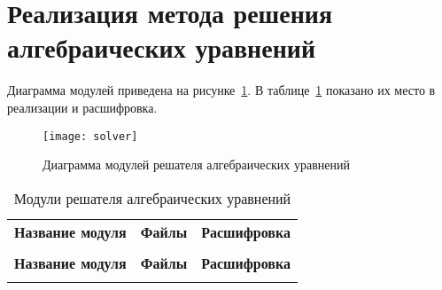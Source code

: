 \section{Реализация метода решения алгебраических уравнений}\label{solverimpl}

Диаграмма модулей приведена на рисунке~\ref{solvermodules}. В таблице~\ref{solvermodulestable} показано их место в реализации и расшифровка.

\begin{figure}[H]
    \centering
    \texttt{[image: solver]}
    \caption{Диаграмма модулей решателя алгебраических уравнений\label{solvermodules}}
\end{figure}

\begin{centering}
    \begin{longtable}{|l|l|l|}
        \caption{Модули решателя алгебраических уравнений} \label{solvermodulestable}                                                                                                                                                                                              \\

        \hline \multicolumn{1}{|c|}{\textbf{Название модуля}} & \multicolumn{1}{c|}{\textbf{Файлы}}                                                                                                      & \multicolumn{1}{c|}{\textbf{Расшифровка}}                               \\ \hhline{|=|=|=|}
        \endfirsthead

        \multicolumn{3}{c}%
        {\hspace{-12.5cm}{Окончание таблицы \thetable} \vspace{1ex}}                                                                                                                                                                                                               \\
        \hline \multicolumn{1}{|c|}{\textbf{Название модуля}} & \multicolumn{1}{c|}{\textbf{Файлы}}                                                                                                      & \multicolumn{1}{c|}{\textbf{Расшифровка}}                               \\ \hhline{|=|=|=|}
        \endhead


\end{longtable}
\end{centering}
